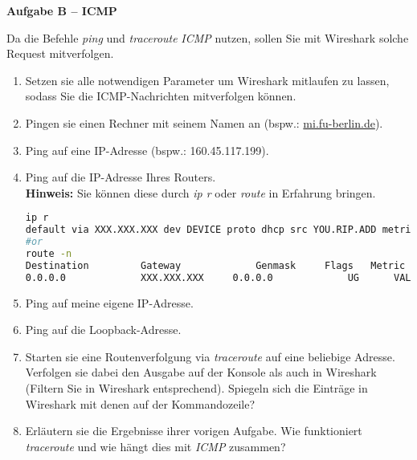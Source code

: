 \documentclass[paper=a4,fontsize=11pt]{scrartcl}%
\begin{document}
\begin{center}\Large{\textbf{Aufgabe B -- ICMP}}\end{center}\vskip0.2in
Da die Befehle \emph{ping} und \emph{traceroute} \emph{ICMP} nutzen, sollen Sie mit Wireshark solche Request mitverfolgen.
\begin{enumerate}
	\item Setzen sie alle notwendigen Parameter um Wireshark mitlaufen zu lassen, sodass Sie die ICMP-Nachrichten mitverfolgen können.
	\item Pingen sie einen Rechner mit seinem Namen an (bspw.: \url{mi.fu-berlin.de}).
	\item Ping auf eine IP-Adresse (bspw.: 160.45.117.199).
	\item Ping auf die IP-Adresse Ihres Routers. \\\textbf{Hinweis:} Sie können diese durch \emph{ip r} oder \emph{route} in Erfahrung bringen. 
	\begin{lstlisting}[style=Bash, language=Bash]
ip r
default via XXX.XXX.XXX dev DEVICE proto dhcp src YOU.RIP.ADD metric VALUE
#or
route -n
Destination     	Gateway         	Genmask		Flags 	Metric 		Ref    	Use 	Iface
0.0.0.0          	XXX.XXX.XXX   	0.0.0.0         	UG    	VALUE    	0        	0 		DEVICE
	\end{lstlisting}
	\item Ping auf meine eigene IP-Adresse.
	\item Ping auf die Loopback-Adresse.
	\item Starten sie eine Routenverfolgung via \emph{traceroute} auf eine beliebige Adresse. Verfolgen sie dabei den Ausgabe auf der Konsole als auch in Wireshark (Filtern Sie in Wireshark entsprechend). Spiegeln sich die Einträge in Wireshark mit denen auf der Kommandozeile?
	\item Erläutern sie die Ergebnisse ihrer vorigen Aufgabe. Wie funktioniert \emph{traceroute} und wie hängt dies mit \emph{ICMP} zusammen?
\end{enumerate}
\end{document}
